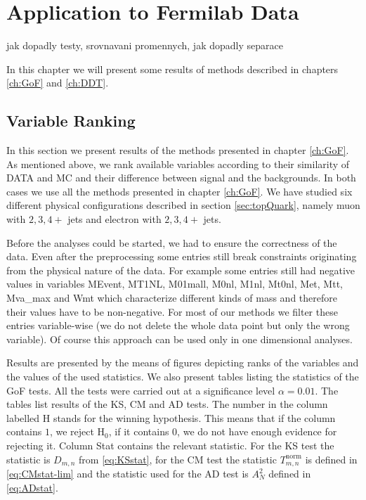 \chapter{Application to Fermilab Data}
jak dopadly testy, srovnavani promennych, jak dopadly separace

\noindent In this chapter we will present some results of methods described in chapters \ref{ch:GoF} and \ref{ch:DDT}. 

\section{Variable Ranking}
In this section we present results  of the methods presented in chapter \ref{ch:GoF}. As mentioned above, we rank available variables according to their similarity of DATA and MC and their difference between signal and the backgrounds. In both cases we use all the methods presented in chapter \ref{ch:GoF}. We have studied six different physical configurations described in section \ref{sec:topQuark}, namely muon with $2, 3, 4+$ jets and electron with $2, 3, 4+$ jets.

Before the analyses could be started, we had to ensure the correctness of the data. Even after the preprocessing some entries still break constraints originating from the physical nature of the data. For example some entries still had negative values in variables \textsf{MEvent, MT1NL, M01mall, M0nl, M1nl, Mt0nl, Met, Mtt, Mva\_max} and \textsf{Wmt} which characterize different kinds of mass and therefore their values have to be non-negative. For most of our methods we filter these entries variable-wise (we do not delete the whole data point but only the wrong variable). Of course this approach can be used only in one dimensional analyses. 

Results are presented by the means of figures depicting ranks of the variables and the values of the used statistics. We also present tables listing the statistics of the GoF tests. All the tests were carried out at a significance level $\alpha = 0.01.$ The tables list results of the KS, CM and AD tests. The number in the column labelled \textsf{H} stands for the winning hypothesis. This means that if the column contains $1$, we reject $\mathrm{H}_0$, if it contains $0$, we do not have enough evidence for rejecting it. Column \textsf{Stat} contains the relevant statistic. For the KS test the statistic is $D_{m,n}$ from \eqref{eq:KSstat}, for the CM test the statistic $T^{\mathrm{norm}}_{m,n}$ is defined in \eqref{eq:CMstat-lim} and the statistic used for the AD test is $A_N^2$ defined in \eqref{eq:ADstat}. 

